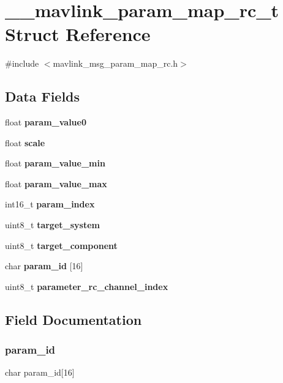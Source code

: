 \section{\+\_\+\+\_\+mavlink\+\_\+param\+\_\+map\+\_\+rc\+\_\+t Struct Reference}
\label{struct____mavlink__param__map__rc__t}


{\ttfamily \#include $<$mavlink\+\_\+msg\+\_\+param\+\_\+map\+\_\+rc.\+h$>$}

\subsection*{Data Fields}
\begin{DoxyCompactItemize}
\item 
float \textbf{ param\+\_\+value0}
\item 
float \textbf{ scale}
\item 
float \textbf{ param\+\_\+value\+\_\+min}
\item 
float \textbf{ param\+\_\+value\+\_\+max}
\item 
int16\+\_\+t \textbf{ param\+\_\+index}
\item 
uint8\+\_\+t \textbf{ target\+\_\+system}
\item 
uint8\+\_\+t \textbf{ target\+\_\+component}
\item 
char \textbf{ param\+\_\+id} [16]
\item 
uint8\+\_\+t \textbf{ parameter\+\_\+rc\+\_\+channel\+\_\+index}
\end{DoxyCompactItemize}


\subsection{Field Documentation}
\mbox{\label{struct____mavlink__param__map__rc__t_a3167e09cdc92f9b6981b87379d5fd336}} 
\subsubsection{param\+\_\+id}
{\footnotesize\ttfamily char param\+\_\+id[16]}

\mbox{\label{struct____mavlink__param__map__rc__t_a87cd2d1b9c4f83642d77ebbe3061691b}} 
